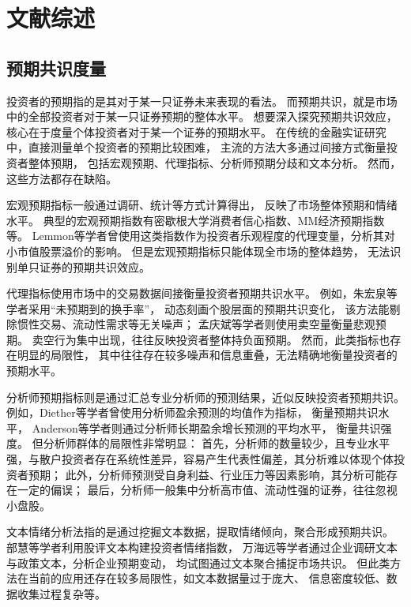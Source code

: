 
\chapter{文献综述}

\section{预期共识度量}
投资者的预期指的是其对于某一只证券未来表现的看法。
而预期共识，就是市场中的全部投资者对于某一只证券预期的整体水平。
想要深入探究预期共识效应，核心在于度量个体投资者对于某一个证券的预期水平。  
在传统的金融实证研究中，直接测量单个投资者的预期比较困难，
主流的方法大多通过间接方式衡量投资者整体预期，
包括宏观预期、代理指标、分析师预期分歧和文本分析\cite{唐国豪2025投资者预期协同}。
然而，这些方法都存在缺陷。

宏观预期指标一般通过调研、统计等方式计算得出，
反映了市场整体预期和情绪水平。
典型的宏观预期指数有密歇根大学消费者信心指数、MM经济预期指数等。
Lemmon等学者曾使用这类指数作为投资者乐观程度的代理变量\cite{lemmon2006consumer}，分析其对小市值股票溢价的影响。
但是宏观预期指标只能体现全市场的整体趋势，
无法识别单只证券的预期共识效应。

代理指标使用市场中的交易数据间接衡量投资者预期共识水平。
例如，朱宏泉等学者\cite{朱宏泉2016异质信念}采用“未预期到的换手率”，
动态刻画个股层面的预期共识变化，
该方法能剔除惯性交易、流动性需求等无关噪声；
孟庆斌等学者\cite{孟庆斌2018卖空机制}则使用卖空量衡量悲观预期。
卖空行为集中出现，往往反映投资者整体持负面预期。
然而，此类指标也存在明显的局限性，
其中往往存在较多噪声和信息重叠，无法精确地衡量投资者的预期水平。

分析师预期指标则是通过汇总专业分析师的预测结果，近似反映投资者预期共识。
例如，Diether等学者曾使用分析师盈余预测的均值作为指标，
衡量预期共识水平\cite{diether2002differences}，
Anderson等学者则通过分析师长期盈余增长预测的平均水平，
衡量共识强度\cite{anderson2005heterogeneous}。
但分析师群体的局限性非常明显：
首先，分析师的数量较少，且专业水平强，与散户投资者存在系统性差异，容易产生代表性偏差，其分析难以体现个体投资者预期；
此外，分析师预测受自身利益、行业压力等因素影响\cite{伍燕然2012分析师预测偏差}，其分析可能存在一定的偏误；
最后，分析师一般集中分析高市值、流动性强的证券，往往忽视小盘股。

文本情绪分析法指的是通过挖掘文本数据，提取情绪倾向，聚合形成预期共识。
部慧等学者利用股评文本构建投资者情绪指数\cite{部慧2018股评投资者情绪}，
万海远等学者通过企业调研文本与政策文本，分析企业预期变动\cite{万海远2024税收政策}，
均试图通过文本聚合捕捉市场共识。
但此类方法在当前的应用还存在较多局限性，如文本数据量过于庞大、
信息密度较低、数据收集过程复杂等。

